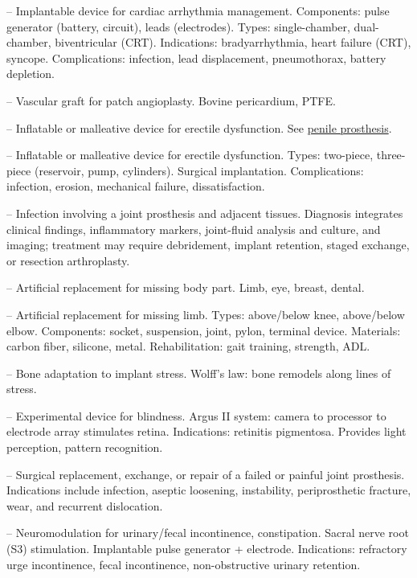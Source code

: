 -- Implantable device for cardiac arrhythmia management. Components: pulse generator (battery, circuit), leads (electrodes). Types: single-chamber, dual-chamber, biventricular (CRT). Indications: bradyarrhythmia, heart failure (CRT), syncope. Complications: infection, lead displacement, pneumothorax, battery depletion.

-- Vascular graft for patch angioplasty. Bovine pericardium, PTFE.

-- Inflatable or malleative device for erectile dysfunction. See \hyperlink{Penile Prosthesis}{penile prosthesis}.


-- Inflatable or malleative device for erectile dysfunction. Types: two-piece, three-piece (reservoir, pump, cylinders). Surgical implantation. Complications: infection, erosion, mechanical failure, dissatisfaction.

-- Infection involving a joint prosthesis and adjacent tissues. Diagnosis integrates clinical findings, inflammatory markers, joint-fluid analysis and culture, and imaging; treatment may require debridement, implant retention, staged exchange, or resection arthroplasty.

-- Artificial replacement for missing body part. Limb, eye, breast, dental.



-- Artificial replacement for missing limb. Types: above/below knee, above/below elbow. Components: socket, suspension, joint, pylon, terminal device. Materials: carbon fiber, silicone, metal. Rehabilitation: gait training, strength, ADL.


-- Bone adaptation to implant stress. Wolff's law: bone remodels along lines of stress.

-- Experimental device for blindness. Argus II system: camera to processor to electrode array stimulates retina. Indications: retinitis pigmentosa. Provides light perception, pattern recognition.



-- Surgical replacement, exchange, or repair of a failed or painful joint prosthesis. Indications include infection, aseptic loosening, instability, periprosthetic fracture, wear, and recurrent dislocation.

-- Neuromodulation for urinary/fecal incontinence, constipation. Sacral nerve root (S3) stimulation. Implantable pulse generator + electrode. Indications: refractory urge incontinence, fecal incontinence, non-obstructive urinary retention.

